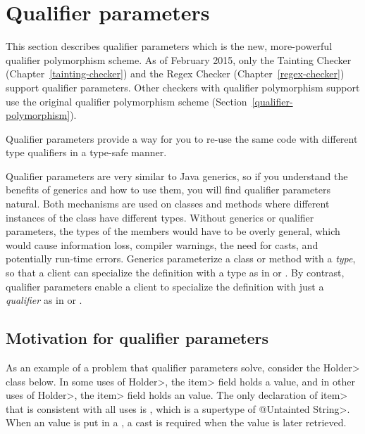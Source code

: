 

\section{Qualifier parameters\label{qualifier-parameters}}

This section describes qualifier parameters which is the new, more-powerful
qualifier polymorphism scheme.  As of February 2015, only the
Tainting Checker (Chapter~\ref{tainting-checker}) and the Regex Checker
(Chapter~\ref{regex-checker}) support qualifier parameters.
Other checkers with
qualifier polymorphism support use the original qualifier polymorphism scheme
(Section~\ref{qualifier-polymorphism}).

Qualifier parameters provide a way for you to re-use the same code with
different type qualifiers in a type-safe manner.

Qualifier parameters are very similar to Java generics, so if you understand the
benefits of generics and how to use them, you will find qualifier
parameters natural.  Both mechanisms are
used on classes and methods where different instances of the class have different
types.  Without generics or qualifier parameters, the types of the members would have
to be overly general, which would cause information loss, compiler
warnings, the need for casts, and potentially run-time errors.
Generics parameterize a class or method with
a \emph{type}, so that a client can specialize the definition with a type
as in  or .  By contrast, qualifier parameters
enable a client to specialize the definition with just a \emph{qualifier}
as in
 or .


\subsection{Motivation for qualifier parameters\label{qualifier-parameters-motivation}}

As an example of a problem that qualifier parameters solve, consider
the \<Holder> class below.  In some uses of \<Holder>, the \<item> field
holds a  value, and in other uses of \<Holder>, the \<item>
field holds an  value.  The only declaration of \<item>
that is consistent with all uses is , which is a supertype
of \<@Untainted String>.  When an  value is put in a ,
a cast is required when the value is later retrieved.

